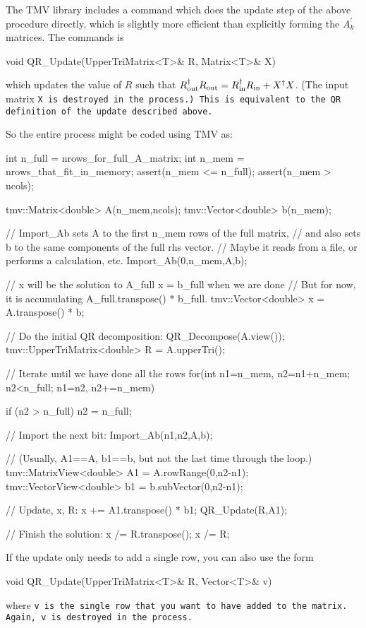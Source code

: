 The TMV library includes a command which does the update step of the above procedure
directly, which is slightly more efficient than explicitly forming the $A_k^\prime$ matrices.
The commands is
\begin{tmvcode}
void QR_Update(UpperTriMatrix<T>& R, Matrix<T>& X)
\end{tmvcode}
which updates the value of $R$ such that $R_{\rm out}^\dagger R_{\rm out} =
R_{\rm in}^\dagger R_{\rm in} + X^\dagger X$.
(The input matrix \tt{X} is destroyed in the process.)  This is equivalent to the QR
definition of the update described above.

So the entire process might be coded using TMV as:
\begin{tmvcode}
int n_full = nrows_for_full_A_matrix;
int n_mem = nrows_that_fit_in_memory;
assert(n_mem <= n_full);
assert(n_mem > ncols);

tmv::Matrix<double> A(n_mem,ncols); 
tmv::Vector<double> b(n_mem);

// Import_Ab sets A to the first n_mem rows of the full matrix, 
// and also sets b to the same components of the full rhs vector.
// Maybe it reads from a file, or performs a calculation, etc.
Import_Ab(0,n_mem,A,b);

// x will be the solution to A_full x = b_full when we are done
// But for now, it is accumulating A_full.transpose() * b_full.
tmv::Vector<double> x = A.transpose() * b;

// Do the initial QR decomposition:
QR_Decompose(A.view());
tmv::UpperTriMatrix<double> R = A.upperTri();

// Iterate until we have done all the rows
for(int n1=n_mem, n2=n1+n_mem; n2<n_full; n1=n2, n2+=n_mem) {
    if (n2 > n_full) n2 = n_full;

    // Import the next bit:
    Import_Ab(n1,n2,A,b);

    // (Usually, A1==A, b1==b, but not the last time through the loop.)
    tmv::MatrixView<double> A1 = A.rowRange(0,n2-n1);
    tmv::VectorView<double> b1 = b.subVector(0,n2-n1);

    // Update, x, R:
    x += A1.transpose() * b1;
    QR_Update(R,A1);
}

// Finish the solution:
x /= R.transpose();
x /= R;
\end{tmvcode}

If the update only needs to add a single row, you can also use the form
\begin{tmvcode}
void QR_Update(UpperTriMatrix<T>& R, Vector<T>& v)
\end{tmvcode}
where \tt{v} is the single row that you want to have added to the matrix.  Again, \tt{v} is destroyed in the process.

